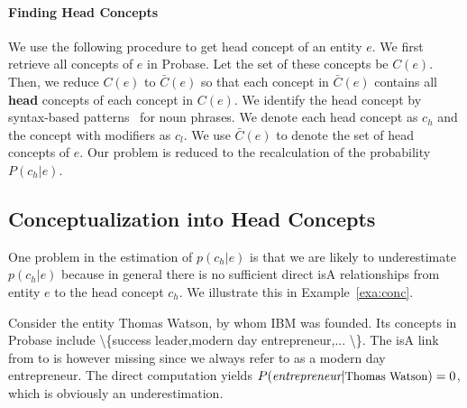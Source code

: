 \paragraph*{Finding Head Concepts}
We use the following procedure to get head concept of an entity $e$.
We first retrieve all concepts of $e$ in Probase. Let the set of these concepts be $C(e)$.
Then, we reduce $C(e)$ to $\bar{C}(e)$ so that each concept in $\bar{C}(e)$ contains all {\bf head} concepts of each concept in $C(e)$.
We identify the head concept by syntax-based patterns~\cite{ponzetto2007deriving} for noun phrases.
We denote each head concept as $c_h$ and the concept with modifiers as $c_{l}$.
We use $\bar{C}(e)$ to denote the set of head concepts of $e$.
Our problem is reduced to the recalculation of the probability $P({c_h}|e)$.




\subsection{Conceptualization into Head Concepts}
One problem in the estimation of $p(c_h|e)$ is that we are likely to underestimate $p(c_h|e)$ because in general there is no sufficient direct isA relationships from entity $e$ to the head concept $c_h$.
We illustrate this in Example~\ref{exa:conc}.


\begin{example}[Underestimation]
\label{exa:conc}
Consider the entity \ac{Thomas Watson}, by whom \ac{IBM} was founded. Its concepts in Probase include \ac{\{success leader,modern day entrepreneur,... \}}. The isA link from  to  is however missing since we always refer to  as a modern day entrepreneur. The direct computation yields $P(\ac{entrepreneur}|\at{\text{Thomas Watson}})=0$, which is obviously an underestimation.
\end{example}




